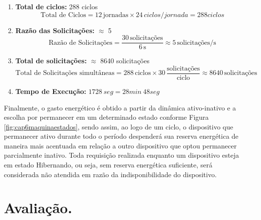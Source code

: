 \begin{enumerate}
	
	\item \textbf{Total de ciclos:} 288 ciclos
	\[
	\text{Total de Ciclos} = 12 \, \text{jornadas} \times 24 \, ciclos/jornada = 288 ciclos
	\]
	\item \textbf{Razão das Solicitações:} $\approx$ 5 \, 
	\[
	\text{Razão de Solicitações} = \frac{30 \, \text{solicitações}}{6 \, \text{s}} \approx 5 \, \text{solicitações/s}
	\]
	\item \textbf{Total de solicitações:} $\approx$ 8640 solicitações
	\[
	\text{Total de Solicitações simultâneas} = 288 \, \text{ciclos} \times 30 \, \frac{\text{solicitações}}{\text{ciclo}} \approx 8640 \, \text{solicitações}
	\]
	
	\item \textbf{Tempo de Execução:} $1728 \ seg = 28min \ 48seg$
	

\end{enumerate}


Finalmente, o gasto energético é obtido a partir da dinâmica ativo-inativo e a escolha por permanecer em um determinado estado conforme Figura \ref{fig:cap6maquinaestados}, sendo assim, ao logo de um ciclo, o dispositivo que permanecer ativo durante todo o período despenderá sua reserva energética de maneira mais acentuada em relação a outro dispositivo que optou permanecer parcialmente inativo. Toda requisição realizada enquanto um dispositivo esteja em estado Hibernando, ou seja, sem reserva energética suficiente, será considerada não atendida em razão da indisponibilidade do dispositivo.




\section{Avaliação.}
\label{cap6:avaliacao}
 